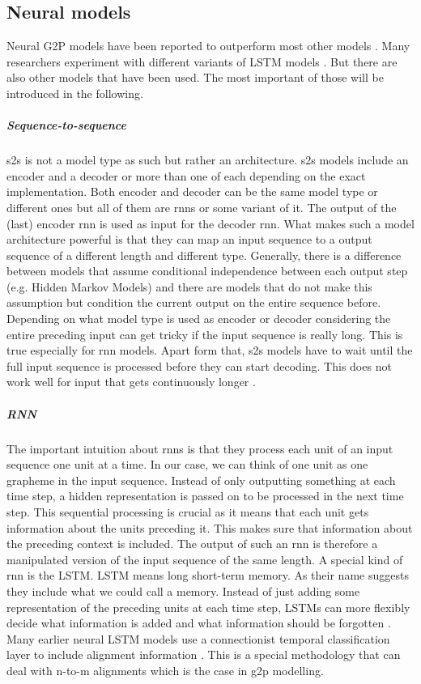\subsection{Neural models}
Neural G2P models have been reported to outperform most other models \citep{Lee&Ashby.2020}. Many researchers experiment with different variants of LSTM models \citep{Lee&Ashby.2020, hammond-2021-data, gautam.2021, Rao2015GraphemetophonemeCU}. But there are also other models that have been used. The most important of those will be introduced in the following.

\subparagraph{Sequence-to-sequence}
\ac{s2s} is not a model type as such but rather an architecture. \ac{s2s} models include an encoder and a decoder or more than one of each depending on the exact implementation. Both encoder and decoder can be the same model type or different ones but all of them are \acp{rnn} or some variant of it. The output of the (last) encoder \ac{rnn} is used as input for the decoder \ac{rnn}. What makes such a model architecture powerful is that they can map an input sequence to a output sequence of a different length and different type. 
Generally, there is a difference between models that assume conditional independence between each output step (e.g. Hidden Markov Models) and there are models that do not make this assumption but condition the current output on the entire sequence before. Depending on what model type is used as encoder or decoder considering the entire preceding input can get tricky if the input sequence is really long. This is true especially for \ac{rnn} models. Apart form that, \ac{s2s} models have to wait until the full input sequence is processed before they can start decoding. This does not work well for input that gets continuously longer \citep{Kostadinov.2019, DBLP:journals/corr/SutskeverVL14}. 

\subparagraph{RNN}
The important intuition about \acp{rnn} is that they process each unit of an input sequence one unit at a time. In our case, we can think of one unit as one grapheme in the input sequence. Instead of only outputting something at each time step, a hidden representation is passed on to be processed in the next time step. This sequential processing is crucial as it means that each unit gets information about the units preceding it. This makes sure that information about the preceding context is included. The output of such an \ac{rnn} is therefore a manipulated version of the input sequence of the same length.
A special kind of \ac{rnn} is the LSTM. LSTM means long short-term memory. As their name suggests they include what we could call a memory. Instead of just adding some representation of the preceding units at each time step, LSTMs can more flexibly decide what information is added and what information should be forgotten \citep{Olah.29.01.2022, Kostadinov.2017}.
Many earlier neural LSTM models use a connectionist temporal classification layer to include alignment information \citep{lo-nicolai-2021-linguistic}. This is a special methodology that can deal with n-to-m alignments which is the case in \ac{g2p} modelling.

